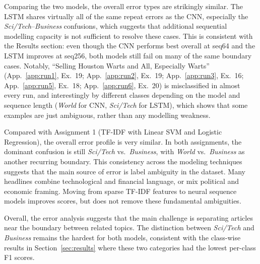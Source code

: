 Comparing the two models, the overall error types are strikingly similar. The LSTM shares virtually all of the same repeat errors as the CNN, especially the \textit{Sci/Tech}--\textit{Business} confusions, which suggests that additional sequential modelling capacity is not sufficient to resolve these cases. This is consistent with the Results section: even though the CNN performs best overall at seq64 and the LSTM improves at seq256, both models still fail on many of the same boundary cases. Notably, ``Selling Houston Warts and All, Especially Warts'' (App.~\ref{app:run1}, Ex.~19; App.~\ref{app:run2}, Ex.~19; App.~\ref{app:run3}, Ex.~16; App.~\ref{app:run5}, Ex.~18; App.~\ref{app:run6}, Ex.~20) is misclassified in almost every run, and interestingly by different classes depending on the model and sequence length (\textit{World} for CNN, \textit{Sci/Tech} for LSTM), which shows that some examples are just ambiguous, rather than any modelling weakness.

Compared with Assignment 1 (TF-IDF with Linear SVM and Logistic Regression), the overall error profile is very similar. In both assignments, the dominant confusion is still \textit{Sci/Tech} vs.\ \textit{Business}, with \textit{World} vs.\ \textit{Business} as another recurring boundary. This consistency across the modeling techniques suggests that the main source of error is label ambiguity in the dataset. Many headlines combine technological and financial language, or mix political and economic framing. Moving from sparse TF-IDF features to neural sequence models improves scores, but does not remove these fundamental ambiguities.

Overall, the error analysis suggests that the main challenge is separating articles near the boundary between related topics. The distinction between \textit{Sci/Tech} and \textit{Business} remains the hardest for both models, consistent with the class-wise results in Section~\ref{sec:results} where these two categories had the lowest per-class F1 scores.
